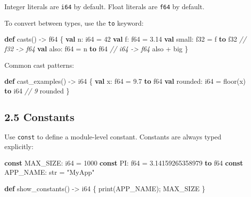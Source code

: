 \documentclass[
  english,
]{book}
\newenvironment{Shaded}{\begin{snugshade}}{\end{snugshade}}
\newcommand{\CommentTok}[1]{\textcolor[rgb]{0.42,0.60,0.33}{\textit{#1}}}
\newcommand{\DataTypeTok}[1]{\textcolor[rgb]{0.31,0.79,0.69}{#1}}
\newcommand{\DecValTok}[1]{\textcolor[rgb]{0.71,0.81,0.66}{#1}}
\newcommand{\FloatTok}[1]{\textcolor[rgb]{0.71,0.81,0.66}{#1}}
\newcommand{\FunctionTok}[1]{\textcolor[rgb]{0.86,0.86,0.67}{#1}}
\newcommand{\KeywordTok}[1]{\textcolor[rgb]{0.34,0.61,0.84}{\textbf{#1}}}
\newcommand{\NormalTok}[1]{\textcolor[rgb]{0.83,0.83,0.83}{#1}}
\newcommand{\OperatorTok}[1]{\textcolor[rgb]{0.83,0.83,0.83}{#1}}
\newcommand{\StringTok}[1]{\textcolor[rgb]{0.81,0.57,0.47}{#1}}
\begin{document}
Integer literals are \texttt{i64} by default. Float literals are
\texttt{f64} by default.

To convert between types, use the \texttt{to} keyword:

\begin{Shaded}
\begin{Highlighting}[]
\KeywordTok{def}\NormalTok{ casts() }\OperatorTok{{-}\textgreater{}} \DataTypeTok{f64}\NormalTok{ \{}
    \KeywordTok{val}\NormalTok{ n: }\DataTypeTok{i64} \OperatorTok{=} \DecValTok{42}
    \KeywordTok{val}\NormalTok{ f: }\DataTypeTok{f64} \OperatorTok{=} \FloatTok{3.14}
    \KeywordTok{val}\NormalTok{ small: }\DataTypeTok{f32} \OperatorTok{=}\NormalTok{ f }\KeywordTok{to} \DataTypeTok{f32}     \CommentTok{// f32 {-}\textgreater{} f64}
    \KeywordTok{val}\NormalTok{ also: }\DataTypeTok{f64} \OperatorTok{=}\NormalTok{ n }\KeywordTok{to} \DataTypeTok{f64}    \CommentTok{// i64 {-}\textgreater{} f64}
\NormalTok{    also }\OperatorTok{+}\NormalTok{ big}
\NormalTok{\}}
\end{Highlighting}
\end{Shaded}

Common cast patterns:

\begin{Shaded}
\begin{Highlighting}[]
\KeywordTok{def}\NormalTok{ cast\_examples() }\OperatorTok{{-}\textgreater{}} \DataTypeTok{i64}\NormalTok{ \{}
    \KeywordTok{val}\NormalTok{ x: }\DataTypeTok{f64} \OperatorTok{=} \FloatTok{9.7} \KeywordTok{to} \DataTypeTok{f64}
    \KeywordTok{val}\NormalTok{ rounded: }\DataTypeTok{i64} \OperatorTok{=} \FunctionTok{floor}\NormalTok{(x) }\KeywordTok{to} \DataTypeTok{i64}     \CommentTok{// 9}
\NormalTok{    rounded}
\NormalTok{\}}
\end{Highlighting}
\end{Shaded}

\subsection{2.5 Constants}\label{constants}

Use \texttt{const} to define a module-level constant. Constants are
always typed explicitly:

\begin{Shaded}
\begin{Highlighting}[]
\KeywordTok{const}\NormalTok{ MAX\_SIZE: }\DataTypeTok{i64} \OperatorTok{=} \DecValTok{1000}
\KeywordTok{const}\NormalTok{ PI: }\DataTypeTok{f64} \OperatorTok{=} \FloatTok{3.14159265358979} \KeywordTok{to} \DataTypeTok{f64}
\KeywordTok{const}\NormalTok{ APP\_NAME: }\DataTypeTok{str} \OperatorTok{=} \StringTok{"MyApp"}

\KeywordTok{def}\NormalTok{ show\_constants() }\OperatorTok{{-}\textgreater{}} \DataTypeTok{i64}\NormalTok{ \{}
    \FunctionTok{print}\NormalTok{(APP\_NAME);}
\NormalTok{    MAX\_SIZE}
\NormalTok{\}}
\end{Highlighting}
\end{Shaded}
\end{document}
